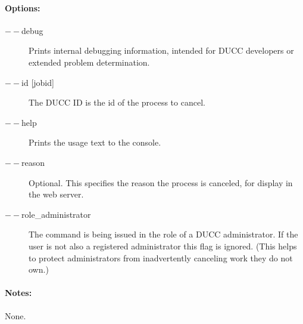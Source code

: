     \paragraph{Options:}
    \begin{description}
        \item[$--$debug ]          
          Prints internal debugging information, intended for DUCC developers or extended problem determination.          
        \item[$--$id {[jobid]}]
          The DUCC ID is the id of the process to cancel.
        \item[$--$help]
          Prints the usage text to the console.
        \item[$--$reason]
          Optional. This specifies the reason the process is canceled, for display in the web server. 
        \item[$--$role\_administrator] The command is being issued in the role of a DUCC administrator.
          If the user is not also a registered administrator this flag is ignored.  (This helps to
          protect administrators from inadvertently canceling work they do not own.)
     \end{description}
        
    \paragraph{Notes:}
    None.

